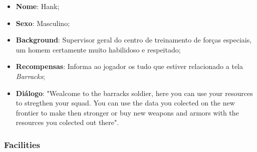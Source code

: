 \documentclass[11pt]{article} %
\begin{document}
\begin{itemize}
  \item \textbf{Nome}: Hank;
  \item \textbf{Sexo}: Masculino;
  \item \textbf{Background}: Supervisor geral do centro de treinamento de forças especiais, um homem certamente muito habilidoso e respeitado;
  \item \textbf{Recompensas}: Informa ao jogador os tudo que estiver relacionado a tela \textit{Barracks};
  \item \textbf{Diálogo}: "Wealcome to the barracks soldier, here you can use your resources to stregthen your squad. You can use the data you colected on the new frontier to make then stronger or buy new weapons and armors with the resources you colected out there".
\end{itemize}

\subsubsection{Facilities}
\end{document}
